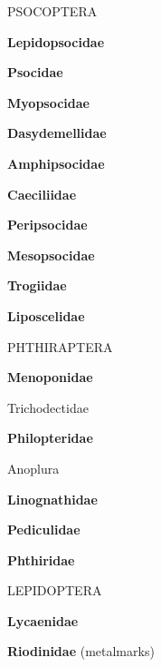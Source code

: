 \documentclass[letterpaper,10pt]{article}
\begin{document}
{%
%
%
\makebox[0.0cm]{}  PSOCOPTERA \par
\makebox[0.6cm]{}  \textbf{Lepidopsocidae} \par
\makebox[0.6cm]{}  \textbf{Psocidae} \par
\makebox[0.6cm]{}  \textbf{Myopsocidae} \par
\makebox[0.6cm]{}  \textbf{Dasydemellidae} \par
\makebox[0.6cm]{}  \textbf{Amphipsocidae} \par
\makebox[0.6cm]{}  \textbf{Caeciliidae} \par
\makebox[0.6cm]{}  \textbf{Peripsocidae} \par
\makebox[0.6cm]{}  \textbf{Mesopsocidae} \par
\makebox[0.6cm]{}  \textbf{Trogiidae} \par
\makebox[0.6cm]{}  \textbf{Liposcelidae} \par
%
%
%
\makebox[0.0cm]{}  PHTHIRAPTERA \par
\makebox[0.6cm]{}  \textbf{Menoponidae} \par
\makebox[0.20cm]{}  Trichodectidae \par
\makebox[0.6cm]{}  \textbf{Philopteridae} \par
\makebox[0.20cm]{} Anoplura \par
\makebox[0.6cm]{}  \textbf{Linognathidae} \par
\makebox[0.6cm]{}  \textbf{Pediculidae} \par
\makebox[0.6cm]{}  \textbf{Phthiridae} \par
%
%
%
\makebox[0.0cm]{}  LEPIDOPTERA\par
\makebox[0.6cm]{}  \textbf{Lycaenidae} \par
\makebox[0.6cm]{}  \textbf{Riodinidae} (metalmarks) \par
}
\end{document}
